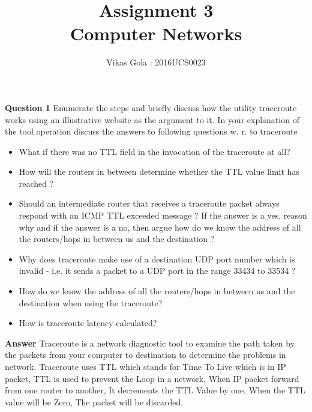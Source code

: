 \documentclass[14pt]{extarticle}
\begin{document}
    \pagestyle{plain}

    \title{\Huge Assignment 3\\ Computer Networks}
    \author{\huge Vikas Gola : 2016UCS0023}
    \maketitle
    \newpage

    \noindent
    \textbf{\large Question 1}
    Enumerate the steps and briefly discuss how the utility traceroute works using an illustrative website as
the argument to it. In your explanation of the tool operation discuss the answers to following questions
w. r. to traceroute
    \begin{itemize}
        \item What if there was no TTL field in the invocation of the traceroute at all?
        \item How will the routers in between determine whether the TTL value limit has reached ?
        \item Should an intermediate router that receives a traceroute packet always respond with an ICMP TTL
        exceeded message ? If the answer is a yes, reason why and if the answer is a no, then argue how do
        we know the address of all the routers/hops in between us and the destination ?
        \item Why does traceroute make use of a destination UDP port number which is invalid - i.e. it sends a
        packet to a UDP port in the range 33434 to 33534 ?
        \item How do we know the address of all the routers/hops in between us and the destination when using
        the traceroute?
        \item How is traceroute latency calculated?
    \end{itemize}
    \textbf{\large Answer}
    Traceroute is a network diagnostic tool to examine the path taken by the packets from your computer to destination to determine the problems in network.
    Traceroute uses TTL which stands for Time To Live which is in IP packet, TTL is used to prevent the Loop in a network, When IP packet forward from one router to another, It decrements the TTL Value by one, When the TTL value will be Zero, The packet will be discarded.
\end{document}
